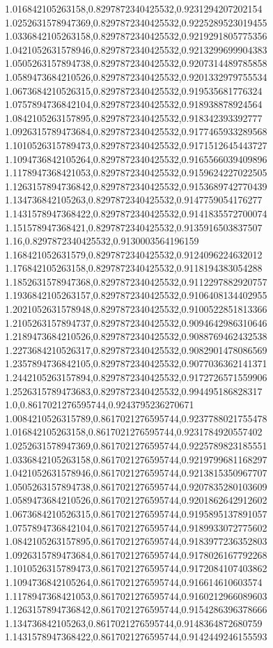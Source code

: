 1.016842105263158,0.8297872340425532,0.9231294207202154
1.0252631578947369,0.8297872340425532,0.9225289523019455
1.0336842105263158,0.8297872340425532,0.9219291805775356
1.0421052631578946,0.8297872340425532,0.9213299699904383
1.0505263157894738,0.8297872340425532,0.9207314489785858
1.0589473684210526,0.8297872340425532,0.9201332979755534
1.0673684210526315,0.8297872340425532,0.919535681776324
1.0757894736842104,0.8297872340425532,0.918938878924564
1.0842105263157895,0.8297872340425532,0.918342393392777
1.0926315789473684,0.8297872340425532,0.9177465933289568
1.1010526315789473,0.8297872340425532,0.9171512645443727
1.1094736842105264,0.8297872340425532,0.9165566039409896
1.1178947368421053,0.8297872340425532,0.9159624227022505
1.1263157894736842,0.8297872340425532,0.9153689742770439
1.134736842105263,0.8297872340425532,0.9147759054176277
1.1431578947368422,0.8297872340425532,0.9141835572700074
1.151578947368421,0.8297872340425532,0.9135916503837507
1.16,0.8297872340425532,0.9130003564196159
1.168421052631579,0.8297872340425532,0.9124096224632012
1.176842105263158,0.8297872340425532,0.9118194383054288
1.1852631578947368,0.8297872340425532,0.9112297882920757
1.1936842105263157,0.8297872340425532,0.9106408134402955
1.2021052631578948,0.8297872340425532,0.9100522851813366
1.2105263157894737,0.8297872340425532,0.9094642986310646
1.2189473684210526,0.8297872340425532,0.9088769462432538
1.2273684210526317,0.8297872340425532,0.9082901478086569
1.2357894736842105,0.8297872340425532,0.9077036362141371
1.2442105263157894,0.8297872340425532,0.9172726571559906
1.2526315789473683,0.8297872340425532,0.994495186828317
1.0,0.8617021276595744,0.9243795236270671
1.0084210526315789,0.8617021276595744,0.9237788021755478
1.016842105263158,0.8617021276595744,0.9231784920557402
1.0252631578947369,0.8617021276595744,0.9225789823185551
1.0336842105263158,0.8617021276595744,0.9219799681168297
1.0421052631578946,0.8617021276595744,0.9213815350967707
1.0505263157894738,0.8617021276595744,0.9207835280103609
1.0589473684210526,0.8617021276595744,0.9201862642912602
1.0673684210526315,0.8617021276595744,0.9195895137891057
1.0757894736842104,0.8617021276595744,0.9189933072775602
1.0842105263157895,0.8617021276595744,0.9183977236352803
1.0926315789473684,0.8617021276595744,0.9178026167792268
1.1010526315789473,0.8617021276595744,0.9172084107403862
1.1094736842105264,0.8617021276595744,0.916614610603574
1.1178947368421053,0.8617021276595744,0.9160212966089603
1.1263157894736842,0.8617021276595744,0.9154286396378666
1.134736842105263,0.8617021276595744,0.9148364872680759
1.1431578947368422,0.8617021276595744,0.9142449246155593
